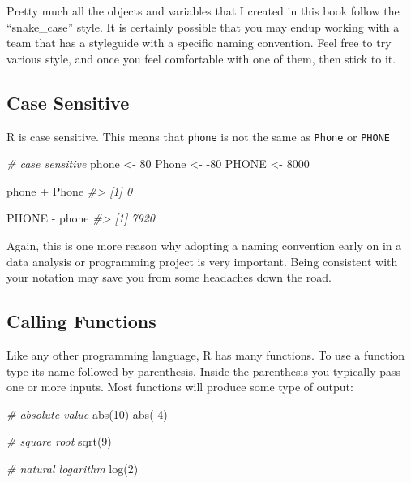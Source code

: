 \documentclass[
]{book}
\newenvironment{Shaded}{\begin{snugshade}}{\end{snugshade}}
\newcommand{\CommentTok}[1]{\textcolor[rgb]{0.56,0.35,0.01}{\textit{#1}}}
\newcommand{\DecValTok}[1]{\textcolor[rgb]{0.00,0.00,0.81}{#1}}
\newcommand{\FunctionTok}[1]{\textcolor[rgb]{0.00,0.00,0.00}{#1}}
\newcommand{\NormalTok}[1]{#1}
\newcommand{\OtherTok}[1]{\textcolor[rgb]{0.56,0.35,0.01}{#1}}
\newcommand{\SpecialCharTok}[1]{\textcolor[rgb]{0.00,0.00,0.00}{#1}}
\begin{document}
Pretty much all the objects and variables that I created in this book follow the
``snake\_case'' style. It is certainly possible that you may endup working with
a team that has a styleguide with a specific naming convention. Feel free to try
various style, and once you feel comfortable with one of them, then stick to it.

\hypertarget{case-sensitive}{%
\subsection{Case Sensitive}\label{case-sensitive}}

R is case sensitive. This means that \texttt{phone} is not the same as \texttt{Phone} or
\texttt{PHONE}

\begin{Shaded}
\begin{Highlighting}[]
\CommentTok{\# case sensitive}
\NormalTok{phone }\OtherTok{\textless{}{-}} \DecValTok{80}
\NormalTok{Phone }\OtherTok{\textless{}{-}} \SpecialCharTok{{-}}\DecValTok{80}
\NormalTok{PHONE }\OtherTok{\textless{}{-}} \DecValTok{8000}

\NormalTok{phone }\SpecialCharTok{+}\NormalTok{ Phone}
\CommentTok{\#\textgreater{} [1] 0}

\NormalTok{PHONE }\SpecialCharTok{{-}}\NormalTok{ phone}
\CommentTok{\#\textgreater{} [1] 7920}
\end{Highlighting}
\end{Shaded}

Again, this is one more reason why adopting a naming convention early on in
a data analysis or programming project is very important. Being consistent with
your notation may save you from some headaches down the road.

\hypertarget{calling-functions}{%
\subsection{Calling Functions}\label{calling-functions}}

Like any other programming language, R has many functions. To use a function
type its name followed by parenthesis. Inside the parenthesis you typically
pass one or more inputs. Most functions will produce some type of output:

\begin{Shaded}
\begin{Highlighting}[]
\CommentTok{\# absolute value}
\FunctionTok{abs}\NormalTok{(}\DecValTok{10}\NormalTok{)}
\FunctionTok{abs}\NormalTok{(}\SpecialCharTok{{-}}\DecValTok{4}\NormalTok{)}

\CommentTok{\# square root}
\FunctionTok{sqrt}\NormalTok{(}\DecValTok{9}\NormalTok{)}

\CommentTok{\# natural logarithm}
\FunctionTok{log}\NormalTok{(}\DecValTok{2}\NormalTok{)}
\end{Highlighting}
\end{Shaded}
\end{document}
